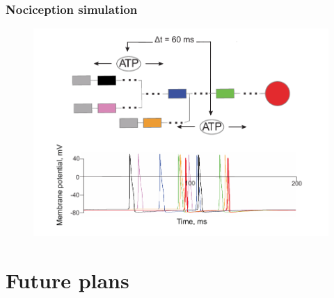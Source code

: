 \documentclass[12pt, aspectratio=169]{beamer}
\begin{document}
\begin{frame}
  \frametitle{Nociception simulation}
  \begin{figure}
    \includegraphics[width=0.7\linewidth]{2_3.pdf}
  \end{figure}
\end{frame}

\section{Future plans}
\end{document}

